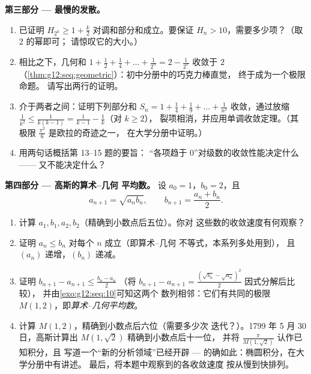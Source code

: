 \begin{problem}
\medskip
\noindent\textbf{第三部分 --- 最慢的发散。}
\begin{enumerate}[resume]
  \item {} 已证明
        $H_{2^k} \geq 1 + \frac k2$ 对调和部分和成立。要保证
        $H_n > 10$，需要多少项？（取 2 的幂即可；
        请惊叹它的大小。）
  \item 相比之下，几何和
        $1 + \frac12 + \frac14 + \dots + \frac{1}{2^n} =
        2 - \frac{1}{2^n}$ 收敛于 $2$
        （\cref{thm:g12:seq:geometric}）：初中分册中的巧克力棒直觉，
        终于成为一个极限命题。
        请写出两行的证明。
  \item 介于两者之间：证明下列部分和
        $S_n = 1 + \frac{1}{4} + \frac{1}{9} + \dots +
        \frac{1}{n^2}$ 收敛，通过放缩
        $\frac{1}{k^2} \leq \frac{1}{k(k-1)} =
        \frac{1}{k-1} - \frac{1}{k}$（对 $k \geq 2$），
        裂项相消，并应用单调收敛定理。（其
        极限 $\frac{\pi^2}{6}$ 是欧拉的奇迹之一，
        在大学分册中证明。）
  \item 用两句话概括第 13--15 题的要旨：
        “各项趋于 $0$”对级数的收敛性能决定什么——
        又不能决定什么？
\end{enumerate}

\medskip
\noindent\textbf{第四部分 --- 高斯的算术--几何
平均数。}
设 $a_0 = 1$，$b_0 = 2$，且
\[
a_{n+1} = \sqrt{a_n b_n},
\qquad
b_{n+1} = \frac{a_n + b_n}{2} .
\]
\begin{enumerate}[resume]
  \item 计算 $a_1, b_1, a_2, b_2$（精确到小数点后五位）。你对
        这些数的收敛速度有何观察？
  \item 证明 $a_n \leq b_n$ 对每个 $n$ 成立（即算术--几何
        不等式，本系列多处用到），
        且 $(a_n)$ 递增，$(b_n)$ 递减。
  \item 证明
        $b_{n+1} - a_{n+1} \leq \frac{b_n - a_n}{2}$
        （将 $b_{n+1} - a_{n+1} =
        \frac{(\sqrt{b_n} - \sqrt{a_n})^2}{2}$ 因式分解后比较），
        并由\cref{exo:g12:seq:10}可知这两个
        数列相邻：它们有共同的极限
        $M(1, 2)$，即\emph{算术--几何平均数}。
  \item 计算 $M(1, 2)$，精确到小数点后六位（需要多少次
        迭代？）。1799 年 5 月 30 日，高斯计算出
        $M(1, \sqrt2)$ 精确到小数点后十一位，
        并将 $\frac{\pi}{M(1,\sqrt2)}$ 认作已知积分，且
        写道一个“新的分析领域”已经开辟 ---
        的确如此：椭圆积分，在大学分册中有讲述。
        最后，将本题中观察到的各收敛速度
        按从慢到快排列。
\end{enumerate}
\end{problem}
